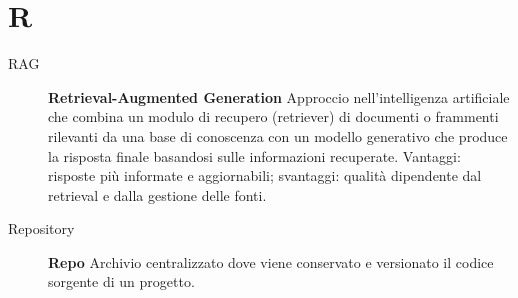 \section*{R}
\begin{description}
    \item[RAG] \textbf{Retrieval-Augmented Generation} Approccio nell'intelligenza artificiale che combina un modulo di recupero (retriever) di documenti o frammenti rilevanti da una base di conoscenza con un modello generativo che produce la risposta finale basandosi sulle informazioni recuperate. Vantaggi: risposte più informate e aggiornabili; svantaggi: qualità dipendente dal retrieval e dalla gestione delle fonti.
    \item[Repository] \textbf{Repo} Archivio centralizzato dove viene conservato e versionato il codice sorgente di un progetto.
\end{description}

